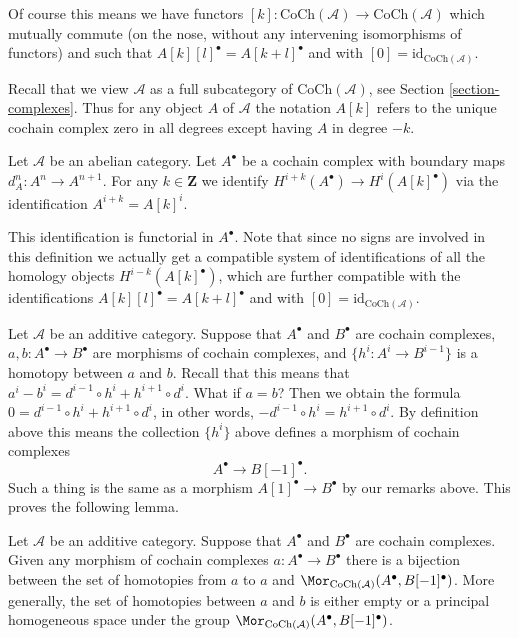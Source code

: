 \noindent
Of course this means we have functors
$[k] : \text{CoCh}(\mathcal{A}) \to \text{CoCh}(\mathcal{A})$
which mutually commute (on the nose, without
any intervening isomorphisms of functors) and
such that $A[k][l]^\bullet = A[k + l]^\bullet$ and
with $[0] = \text{id}_{\text{CoCh}(\mathcal{A})}$.

\medskip\noindent
Recall that we view $\mathcal{A}$ as a full subcategory of
$\text{CoCh}(\mathcal{A})$, see Section \ref{section-complexes}.
Thus for any object $A$ of $\mathcal{A}$ the notation $A[k]$
refers to the unique cochain complex zero in all degrees except having
$A$ in degree $-k$.

\begin{definition}
\label{definition-cohomology-shift}
Let $\mathcal{A}$ be an abelian category.
Let $A^\bullet$ be a cochain complex
with boundary maps $d_A^n : A^n \to A^{n + 1}$.
For any $k \in \mathbf{Z}$ we identify
{\it $H^{i + k}(A^\bullet) \longrightarrow H^i(A[k]^\bullet)$}
via the identification $A^{i + k} = A[k]^i$.
\end{definition}

\noindent
This identification is functorial in $A^\bullet$.
Note that since no signs are involved in this
definition we actually get a compatible system
of identifications of all the homology
objects $H^{i - k}(A[k]^\bullet)$, which are
further compatible with the identifications
$A[k][l]^\bullet = A[k + l]^\bullet$ and
with $[0] = \text{id}_{\text{CoCh}(\mathcal{A})}$.

\medskip\noindent
Let $\mathcal{A}$ be an additive category.
Suppose that $A^\bullet$ and $B^\bullet$ are
cochain complexes, $a, b : A^\bullet \to B^\bullet$ are
morphisms of cochain complexes, and $\{h^i : A^i \to B^{i - 1}\}$
is a homotopy between $a$ and $b$. Recall that this means
that
$a^i - b^i = d^{i - 1} \circ h^i + h^{i + 1} \circ d^i$.
What if $a = b$? Then we obtain the formula
$0 = d^{i - 1} \circ h^i + h^{i + 1} \circ d^i$,
in other words, $ - d^{i - 1} \circ h^i = h^{i + 1} \circ d^i$.
By definition above this means the collection $\{h^i\}$
above defines a morphism of cochain complexes
$$
A^\bullet \longrightarrow B[-1]^\bullet.
$$
Such a thing is the same as a morphism $A[1]^\bullet \to B^\bullet$
by our remarks above. This proves the following lemma.

\begin{lemma}
\label{lemma-homotopy-shift-cochain}
Let $\mathcal{A}$ be an additive category.
Suppose that $A^\bullet$ and $B^\bullet$ are
cochain complexes. Given any morphism of cochain
complexes $a : A^\bullet \to B^\bullet$ there
is a bijection between the set of homotopies
from $a$ to $a$ and
$\Mor_{\text{CoCh}(\mathcal{A})}(A^\bullet, B[-1]^\bullet)$.
More generally, the set of homotopies between
$a$ and $b$ is either empty or a principal homogeneous
space under the group
$\Mor_{\text{CoCh}(\mathcal{A})}(A^\bullet, B[-1]^\bullet)$.
\end{lemma}

